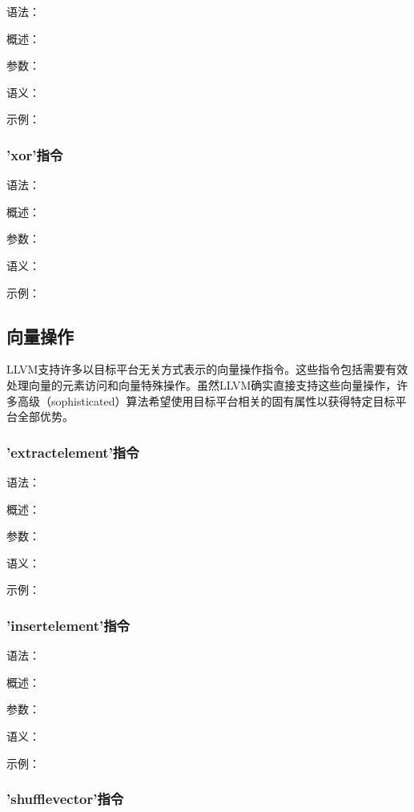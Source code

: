 \documentclass[12pt,a4paper]{article}
\begin{document}
{语法：

概述：

参数：

语义：

示例：


\subsubsection{'xor'指令} %

语法：

概述：

参数：

语义：

示例：


\subsection{向量操作}

LLVM支持许多以目标平台无关方式表示的向量操作指令。这些指令包括需要有效处理向量的元素访问和向量特殊操作。虽然LLVM确实直接支持这些向量操作，许多高级（sophisticated）算法希望使用目标平台相关的固有属性以获得特定目标平台全部优势。

\subsubsection{'extractelement'指令} %

语法：

概述：

参数：

语义：

示例：


\subsubsection{'insertelement'指令} %

语法：

概述：

参数：

语义：

示例：


\subsubsection{'shufflevector'指令} %

}
\end{document}
